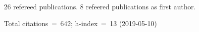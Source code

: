26 refereed publications. 8 refeered publications as first author.

Total citations~=~642; h-index~=~13 (2019-05-10)
